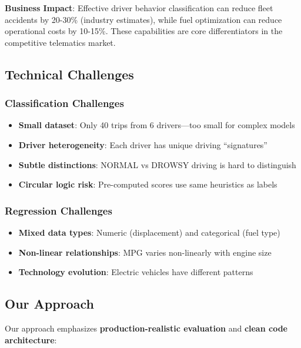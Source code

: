 \documentclass[11pt,a4paper]{article}
\begin{document}
\textbf{Business Impact}: Effective driver behavior classification can reduce fleet accidents by 20-30\% (industry estimates), while fuel optimization can reduce operational costs by 10-15\%. These capabilities are core differentiators in the competitive telematics market.

\subsection{Technical Challenges}

\subsubsection{Classification Challenges}
\begin{itemize}[leftmargin=*]
    \item \textbf{Small dataset}: Only 40 trips from 6 drivers---too small for complex models
    \item \textbf{Driver heterogeneity}: Each driver has unique driving ``signatures''
    \item \textbf{Subtle distinctions}: NORMAL vs DROWSY driving is hard to distinguish
    \item \textbf{Circular logic risk}: Pre-computed scores use same heuristics as labels
\end{itemize}

\subsubsection{Regression Challenges}
\begin{itemize}[leftmargin=*]
    \item \textbf{Mixed data types}: Numeric (displacement) and categorical (fuel type)
    \item \textbf{Non-linear relationships}: MPG varies non-linearly with engine size
    \item \textbf{Technology evolution}: Electric vehicles have different patterns
\end{itemize}

\subsection{Our Approach}

Our approach emphasizes \textbf{production-realistic evaluation} and \textbf{clean code architecture}:
\end{document}
